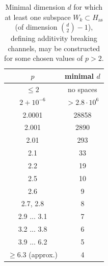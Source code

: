 \documentclass[reqno]{amsart}
\theoremstyle{plain}
\theoremstyle{note}
\newcommand{\aspace}{H_{\mathrm{as}}}
\begin{document}
\begin{table}[ht]
    \caption{Minimal dimension $d$ for which at least one subspace $W_k \subset \aspace$ (of dimension $\binom{d}{2}-1$), defining additivity breaking channels, may be constructed for some chosen values of $p > 2$.}
    \label{tab:MinimalD_Subspaces}
    \centering
    \begin{tabular}{|c|c|}\hline
        $p$           & minimal $d$ \\ \hline
        $\leqslant 2$ & no spaces   \\
        $2 + 10^{-6}$ & $>2.8 \cdot 10^6$ \\
        2.0001          & 28858        \\
        2.001          & 2890      \\
        2.01          & 293      \\
        2.1           & 33         \\
        2.2           & 19      \\
        2.5           & 10      \\
        2.6           & 9 \\
        2.7, 2.8      & 8 \\
        2.9 ... 3.1 & 7 \\
        3.2 ... 3.8 & 6 \\
        3.9 ... 6.2 & 5 \\
        $\geqslant 6.3$ (approx.) & 4 \\ \hline
    \end{tabular}
\end{table}
\end{document}
